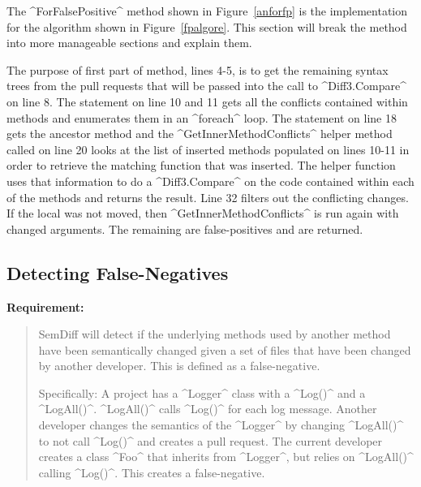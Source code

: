 \documentclass[draftclsnofoot,onecolumn]{IEEEtran}
\begin{document}

The ^ForFalsePositive^ method shown in Figure~\ref{anforfp} is the implementation for the algorithm shown in Figure~\ref{fpalgore}. This section will break the method into more manageable sections and explain them.

The purpose of first part of method, lines 4-5, is to get the remaining syntax trees from the pull requests that will be passed into the call to ^Diff3.Compare^ on line 8. The statement on line 10 and 11 gets all the conflicts contained within methods and enumerates them in an ^foreach^ loop. The statement on line 18 gets the ancestor method and the ^GetInnerMethodConflicts^ helper method called on line 20 looks at the list of inserted methods populated on lines 10-11 in order to retrieve the matching function that was inserted. The helper function uses that information to do a ^Diff3.Compare^ on the code contained within each of the methods and returns the result. Line 32 filters out the conflicting changes. If the local was not moved, then ^GetInnerMethodConflicts^ is run again with changed arguments. The remaining are false-positives and are returned.

\newpage

\subsection{Detecting False-Negatives}%

\textbf{Requirement:}

\begin{quote}

SemDiff will detect if the underlying methods used by another method have been semantically changed given a set of files that have been changed by another developer. This is defined as a false-negative. 

Specifically: A project has a ^Logger^ class with a ^Log()^ and a ^LogAll()^. ^LogAll()^ calls ^Log()^ for each log message. Another developer changes the semantics of the ^Logger^ by changing ^LogAll()^ to not call ^Log()^ and creates a pull request. The current developer creates a class ^Foo^ that inherits from ^Logger^, but relies on ^LogAll()^ calling ^Log()^. This creates a false-negative.

\end{quote}
\end{document}
